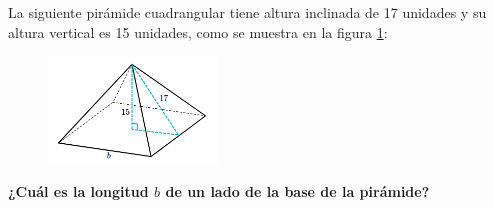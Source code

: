 La siguiente pirámide cuadrangular tiene altura inclinada de 17 unidades y
su altura vertical es 15 unidades, como se muestra en la figura \ref{fig:pitagoras3D_piram_01}:\\
\begin{figure}[H]
    \begin{center}
        \includegraphics[width=0.4\textwidth]{../images/pitagoras3D_piram_01.png}
    \end{center}
    \caption{}
    \label{fig:pitagoras3D_piram_01}
\end{figure}
\textbf{¿Cuál es la longitud $b$ de un lado de la base de la pirámide?}\\